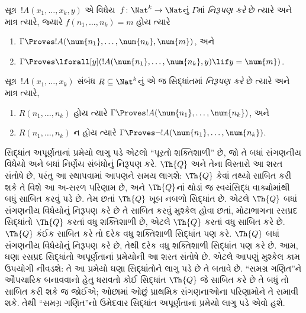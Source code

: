 \begin{defn}
સૂત્ર~$!A(x_1, \dots, x_k, y)$ એ
વિધેય~$f\colon \Nat^k \to \Nat$નું
$\Gamma$માં \emph{નિરૂપણ કરે} છે
ત્યારે અને માત્ર ત્યારે, જ્યારે
$f(n_1, \dots, n_k)=m$ હોય ત્યારે
\begin{enumerate}
\item $\Gamma \Proves !A(\num{n_1}, \dots, \num{n_k}, \num{m})$, અને
\item $\Gamma \Proves \lforall[y](!A(\num{n_1}, \dots, \num{n_k},
y) \lif y = \num{m})$.
\end{enumerate}
\end{defn}

\begin{defn}
સૂત્ર~$!A(x_1, \dots, x_k)$ સંબંધ
$R \subseteq \Nat^k$નું એ જ સિદ્ધાંતમાં
\emph{નિરૂપણ કરે}
છે ત્યારે અને માત્ર ત્યારે,
\begin{enumerate}
\item $R(n_1, \dots, n_k)$ હોય ત્યારે
  $\Gamma \Proves !A(\num{n_1},
\dots, \num{n_k})$, અને
\item $R(n_1, \dots, n_k)$ ન હોય ત્યારે
  $\Gamma \Proves \lnot
!A(\num{n_1}, \dots, \num{n_k})$.
\end{enumerate}
\end{defn}

સિદ્ધાંત અપૂર્ણતાનાં પ્રમેયો લાગુ પડે એટલો
``પૂરતો શક્તિશાળી'' છે, જો તે બધાં સંગણનીય
વિધેયો અને બધાં નિર્ણેય સંબંધોનું
નિરૂપણ કરે. $\Th{Q}$ અને તેના
વિસ્તારો આ શરત સંતોષે છે, પરંતુ આ સ્થાપવામાં
આપણને સમય લાગશે: $\Th{Q}$ કેવાં તથ્યો
સાબિત કરી શકે તે વિશે આ અ-સરળ પરિણામ
છે, અને $\Th{Q}$નાં થોડાં જ સ્વયંસિદ્ધ વાક્યોમાંથી
બધું સાબિત કરવું પડે છે. તેમ છતાં
$\Th{Q}$ ખૂબ નબળો સિદ્ધાંત છે. એટલે
$\Th{Q}$ બધાં સંગણનીય વિધેયોનું
નિરૂપણ કરે છે તે સાબિત કરવું મુશ્કેલ
હોવા છતાં, મોટાભાગના રસપ્રદ સિદ્ધાંતો
$\Th{Q}$ કરતાં વધુ શક્તિશાળી છે, એટલે
$\Th{Q}$ કરતાં વધુ સાબિત કરે છે.
$\Th{Q}$ કંઈક સાબિત કરે તો દરેક વધુ
શક્તિશાળી સિદ્ધાંત પણ કરે. $\Th{Q}$
બધાં સંગણનીય વિધેયોનું નિરૂપણ કરે છે,
તેથી દરેક વધુ શક્તિશાળી સિદ્ધાંત પણ
કરે છે. આમ, ઘણા રસપ્રદ સિદ્ધાંતો
અપૂર્ણતાનાં પ્રમેયોની આ શરત સંતોષે છે.
એટલે આપણું મુશ્કેલ કામ ઉપયોગી નીવડશે:
તે આ પ્રમેયો ઘણા સિદ્ધાંતોને લાગુ પડે
છે તે બતાવે છે. ``સમગ્ર ગણિત''ને
ઔપચારિક બનાવવાનો હેતુ ધરાવતો કોઈ
સિદ્ધાંત $\Th{Q}$ જે સાબિત કરે છે
તે બધું તો સાબિત કરી શકે જ જોઈએ;
ઓછામાં ઓછું પ્રાથમિક સંગણનાઓના
પરિણામોને તે સમાવી શકે. તેથી
``સમગ્ર ગણિત''નો ઉમેદવાર સિદ્ધાંત
અપૂર્ણતાનાં પ્રમેયો લાગુ પડે એવો હશે.
\endgroup


